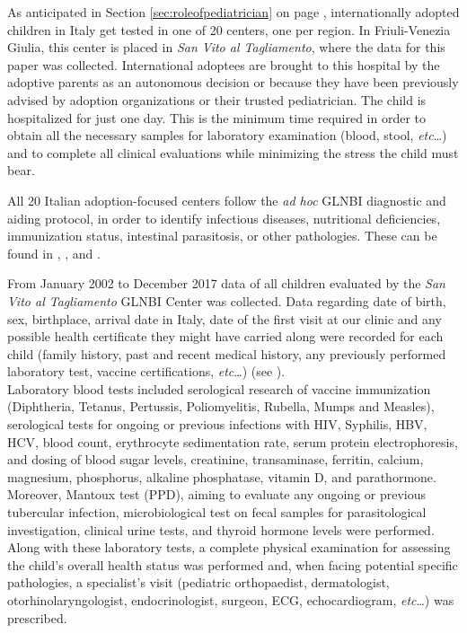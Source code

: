 

\label{chap:materialsandmethods}
As anticipated in Section \ref{sec:roleofpediatrician} on page \pageref{sec:roleofpediatrician},  internationally adopted children in Italy get tested in one of 20 centers, one per region. In Friuli-Venezia Giulia, this center is placed in \textit{San Vito al Tagliamento}, where the data for this paper was collected. International adoptees are brought to this hospital by the adoptive parents as an autonomous decision or because they have been previously advised by adoption organizations or their trusted pediatrician. The child is hospitalized for just one day. This is the minimum time required in order to obtain all the necessary samples for laboratory examination (blood, stool, \textit{etc}\dots) and to complete all clinical evaluations while minimizing the stress the child must bear.

All 20 Italian adoption-focused centers follow the \textit{ad hoc} GLNBI diagnostic and aiding protocol,  in order to identify infectious diseases, nutritional deficiencies, immunization status, intestinal parasitosis, or other pathologies. These can be found in \cite{GNLBI1}, \cite{GNLBI2}, and \cite{GNLBI3}.

From  January 2002 to  December 2017 data of all children evaluated by the \textit{San Vito al Tagliamento} GLNBI Center was collected. Data regarding date of birth, sex, birthplace, arrival date in Italy, date of the first visit at our clinic and any possible health certificate they might have carried along were recorded for each child (family history, past and recent medical history, any previously performed laboratory test, vaccine certifications, \textit{etc}\dots) (see \cite{redbook}).\\
Laboratory blood tests included serological research of vaccine immunization (Diphtheria, Tetanus, Pertussis, Poliomyelitis, Rubella, Mumps and Measles), serological tests for ongoing or previous infections with HIV, Syphilis, HBV, HCV, blood count, erythrocyte sedimentation rate, serum protein electrophoresis, and dosing of blood sugar levels, creatinine, transaminase, ferritin, calcium, magnesium, phosphorus, alkaline phosphatase, vitamin D, and parathormone. Moreover, Mantoux test (PPD), aiming to evaluate any ongoing or previous tubercular infection, microbiological test on fecal samples for parasitological investigation, clinical urine tests, and thyroid hormone levels were performed.\\
Along with these laboratory tests, a complete physical examination for assessing the child's overall health status was performed and, when facing potential specific pathologies, a specialist’s visit (pediatric orthopaedist, dermatologist, otorhinolaryngologist, endocrinologist, surgeon, ECG, echocardiogram, \textit{etc}\dots) was prescribed.

